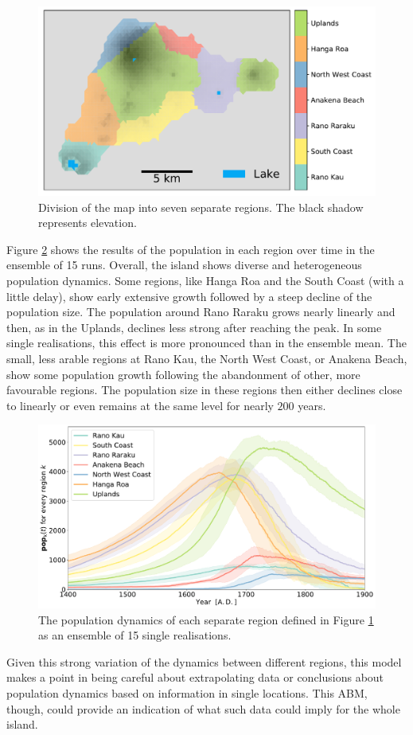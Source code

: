 \begin{figure}
	\centering
	\includegraphics[width=1.0\linewidth]{images/Results/Standard/MapRegionsCoarse}
	\caption{Division of the map into seven separate regions. The black shadow represents elevation.}
	\label{fig:mapregionscoarse}
\end{figure}
Figure \ref{fig:regionalstats} shows the results of the population in each region over time in the ensemble of 15 runs.
Overall, the island shows diverse and heterogeneous population dynamics. 
Some regions, like Hanga Roa and the South Coast (with a little delay), show early extensive growth followed by a steep decline of the population size.
The population around Rano Raraku grows nearly linearly and then, as in the Uplands, declines less strong after reaching the peak.
In some single realisations, this effect is more pronounced than in the ensemble mean.
The small, less arable regions at Rano Kau, the North West Coast, or Anakena Beach, show some population growth following the abandonment of other, more favourable regions.
The population size in these regions then either declines close to linearly or even remains at the same level for nearly $200$ years.
\begin{figure}
	\centering
	\includegraphics[width=1.0\linewidth]{images/Results/Standard/RegionalStatsEnsembleOnly}
	\caption{The population dynamics of each separate region defined in Figure \ref{fig:mapregionscoarse} as an ensemble of 15 single realisations.}
	\label{fig:regionalstats}
\end{figure}
Given this strong variation of the dynamics between different regions, this model makes a point in being careful about extrapolating data or conclusions about population dynamics based on information in single locations.
This ABM, though, could provide an indication of what such data could imply for the whole island.

